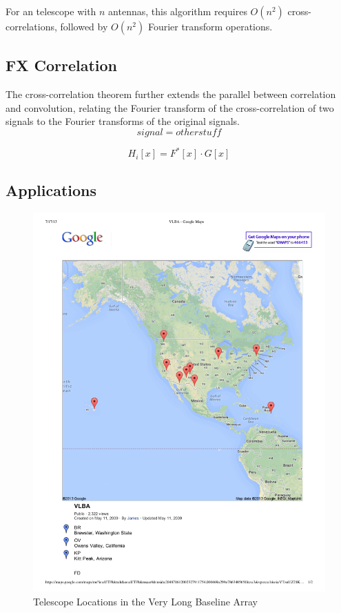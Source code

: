 For an telescope with $n$ antennas, this algorithm requires $O(n^2)$ cross-correlations, followed by $O(n^2)$ Fourier transform operations.
 


\subsection{FX Correlation}
\cite{Bunton:2000tz}

The cross-correlation theorem further extends the parallel between correlation and convolution, relating the Fourier transform of the cross-correlation of two signals to the Fourier transforms of the original signals. 
\[ signal = other stuff\]

\[H_i[x] = F^*[x] \cdot G[x]\]

\subsection{Applications}

\begin{figure}[ht!]
  \centering
    \includegraphics[width=\textwidth]{Images/C3/vlba.pdf}
  \caption{Telescope Locations in the Very Long Baseline Array}
  \label{fig: C3/vlba.pdf}
\end{figure}

